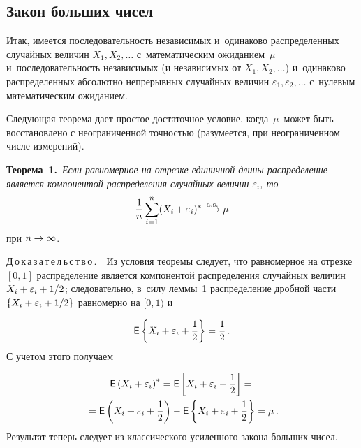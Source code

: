 \begin{multicols}{2}
\vspace*{-12pt}

\section{ Закон больших чисел}

Итак, имеется последовательность независимых и~одинаково распределенных
случайных величин $X_1,X_2,\ldots$ с~математическим ожиданием~$\mu$ и~последовательность
независимых (и независимых от $X_1,X_2,\ldots$) и~одинаково распределенных абсолютно непрерывных
случайных величин
$\varepsilon_1,\varepsilon_2,\ldots$ с~нулевым математическим ожиданием.

Следующая теорема дает простое достаточное условие, когда~$\mu$~может быть 
восстановлено
с неограниченной точностью (разумеется, при неограниченном числе измерений).

\smallskip

\noindent
\textbf{Теорема~1.}\  \textit{Если равномерное на отрезке единичной длины распределение
является компонентой распределения случайных величин $\varepsilon_i$, то}
$$
\displaystyle\frac{\displaystyle 1\mathstrut}{\displaystyle n\mathstrut}\sum\limits_{i=1}^n(X_i+\varepsilon_i)^\ast
\stackrel{\mathrm{a.s.}}{\longrightarrow}\mu
$$
при $n\hm\to\infty$.

\vspace{2pt}

\noindent
Д\,о\,к\,а\,з\,а\,т\,е\,л\,ь\,с\,т\,в\,о\,.\ \ 
Из условия теоремы следует, что равномерное на отрезке $[0,1]$
распределение является компонентой распределения случайных величин
$X_i\hm+\varepsilon_i+1/2$; следовательно, в~силу леммы~1 распределение дробной части
$\{X_i\hm+\varepsilon_i+1/2\}$ равномерно на $[0,1)$ и

\vspace*{2pt}

\noindent
$$
{\sf E}\left\{X_i+\varepsilon_i+\displaystyle\frac{\displaystyle 1\mathstrut}{\displaystyle 2\mathstrut}\right\}=\displaystyle\frac{\displaystyle 1\mathstrut}{\displaystyle 2\mathstrut}\,.
$$
С учетом этого получаем

\vspace*{-4pt}

\noindent
\begin{multline*}
{\sf E}\left(X_i+\varepsilon_i\right)^\ast=
{\sf E}\left[X_i+\varepsilon_i+\displaystyle\frac{\displaystyle 1\mathstrut}{\displaystyle 2\mathstrut}\right]={}\\
{}={\sf E}\left(X_i+\varepsilon_i+\displaystyle\frac{\displaystyle 1\mathstrut}{\displaystyle 2\mathstrut}\right)-
{\sf E}\left\{X_i+\varepsilon_i+\displaystyle\frac{\displaystyle 1\mathstrut}{\displaystyle 2\mathstrut}\right\}=\mu\,.
\end{multline*}
Результат теперь следует из классического усиленного закона больших чисел.


\end{multicols}
